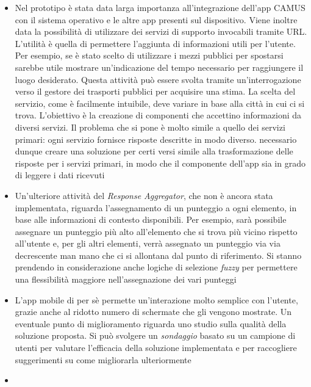 \begin{itemize}
	\item
	Nel prototipo è stata data larga importanza all'integrazione dell'app CAMUS con il sistema operativo e le altre app presenti sul dispositivo. Viene inoltre data la possibilità di utilizzare dei servizi di supporto invocabili tramite URL. L'utilità è quella di permettere l'aggiunta di informazioni utili per l'utente. Per esempio, se è stato scelto di utilizzare i mezzi pubblici per spostarsi sarebbe utile mostrare un'indicazione del tempo necessario per raggiungere il luogo desiderato. Questa attività può essere svolta tramite un'interrogazione verso il gestore dei trasporti pubblici per acquisire una stima. La scelta del servizio, come è facilmente intuibile, deve variare in base alla città in cui ci si trova. L'obiettivo è la creazione di componenti che accettino informazioni da diversi servizi. Il problema che si pone è molto simile a quello dei servizi primari: ogni servizio fornisce risposte descritte in modo diverso. \upe necessario dunque creare una soluzione per certi versi simile alla trasformazione delle risposte per i servizi primari, in modo che il componente dell'app sia in grado di leggere i dati ricevuti
	\item
	Un’ulteriore attività del \emph{Response Aggregator}, che non è ancora stata implementata, riguarda l’assegnamento di un punteggio a ogni elemento, in base alle informazioni di contesto disponibili. Per esempio, sarà possibile assegnare un punteggio più alto all’elemento che si trova più vicino rispetto all’utente e, per gli altri elementi, verrà assegnato un punteggio via via decrescente man mano che ci si allontana dal punto di riferimento. Si stanno prendendo in considerazione anche logiche di selezione \emph{fuzzy} per permettere una flessibilità maggiore nell’assegnazione dei vari punteggi
	\item
	L'app mobile di per sè permette un'interazione molto semplice con l'utente, grazie anche al ridotto numero di schermate che gli vengono mostrate. Un eventuale punto di miglioramento riguarda uno studio sulla qualità della soluzione proposta. Si può svolgere un \emph{sondaggio} basato su un campione di utenti per valutare l'efficacia della soluzione implementata e per raccogliere suggerimenti su come migliorarla ulteriormente
	\item

\end{itemize}
